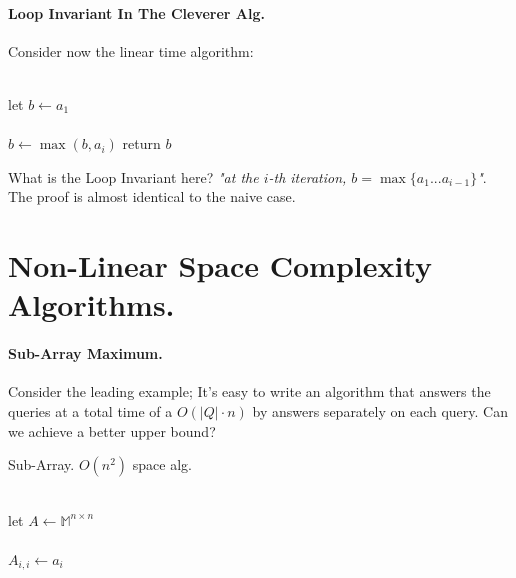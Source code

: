 \paragraph{Loop Invariant In The Cleverer Alg.} Consider now the linear time algorithm:

\begin{algorithm}[H]
{}
 \ \\ 
 let \(b \leftarrow a_1 \) \\ 
 \ \\ 
  { 
        \(b \leftarrow \max \left(b, a_i \right) \)
    } 
 return \( b \) 
 \caption{maximum alg.}
\end{algorithm}

What is the Loop Invariant here? \textit{"at the \(i\)-th iteration, \(b = \max{ \{ a_1 ... a_{i-1} \} } \)"}. The proof is almost identical to the naive case.   

\section{Non-Linear Space Complexity Algorithms. }
\paragraph{Sub-Array Maximum.} Consider the leading example; It's easy to write an algorithm that answers the queries at a total time of a \( O\left( |Q| \cdot n \right) \) by answers separately on each query. Can we achieve a better upper bound?

\begin{algbox}{Sub-Array. \(O(n^2)\) space alg.}
\begin{algorithm}[H]
{}
 \ \\ 
 let \(A \leftarrow \mathbb{M}^{n\times n} \) \\ 
 \ \\ 
  {
    \( A_{i,i} \leftarrow a_i\)
 }
 \ \\
\ \\
\end{algorithm}
\end{algbox}

